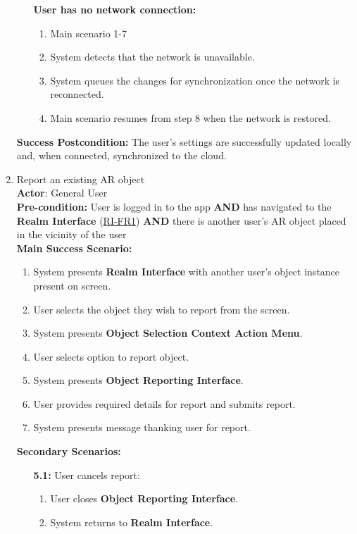 \documentclass{article}
\begin{document}
\begin{enumerate}[label=\textbf{UC\arabic*}]
\begin{itemize}
            \item[{}] \textbf{User has no network connection:}
            \begin{enumerate}[label=\textbf{\arabic*.}]
                \item Main scenario 1-7
                \item System detects that the network is unavailable.
                \item System queues the changes for synchronization once the network is reconnected.
                \item Main scenario resumes from step 8 when the network is restored.
            \end{enumerate}
        \end{itemize}
        \textbf{Success Postcondition:} The user’s settings are successfully updated locally and, when connected, synchronized to the cloud.

    \item \label{uc:14} Report an existing AR object \\ 
        \textbf{Actor}: General User \\ 
        \textbf{Pre-condition:} User is logged in to the app \textbf{AND} has navigated to the \textbf{Realm Interface} (\hyperref[ssub:realm_interface]{RI-FR1}) \textbf{AND} there is another user’s AR object placed in the vicinity of the user \\

        \textbf{Main Success Scenario:}
        \begin{enumerate}[label=\textbf{\arabic*.}]
            \item System presents \textbf{Realm Interface} with another user’s object instance present on screen.
            \item User selects the object they wish to report from the screen.
            \item System presents \textbf{Object Selection Context Action Menu}.
            \item User selects option to report object.
            \item System presents \textbf{Object Reporting Interface}.
            \item User provides required details for report and submits report.
            \item System presents message thanking user for report.
        \end{enumerate}

        \textbf{Secondary Scenarios:}
        \begin{itemize}
            \item[{\bf 5.1:}] User cancels report:
            \begin{enumerate}[label=\textbf{\arabic*.}]
                \item User closes \textbf{Object Reporting Interface}.
                \item System returns to \textbf{Realm Interface}.
            \end{enumerate}


\end{itemize}
\end{enumerate}
\end{document}
